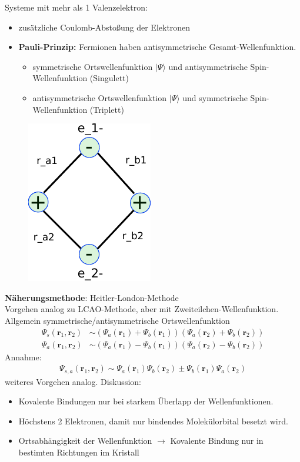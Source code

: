 Systeme mit mehr als 1 Valenzelektron:
\begin{itemize}
	\item zusätzliche Coulomb-Abstoßung der Elektronen
	\item \textbf{Pauli-Prinzip:} Fermionen haben antisymmetrische Gesamt-Wellenfunktion.
	\begin{itemize}
		\item symmetrische Ortswellenfunktion $\vert\Psi\rangle$ und antisymmetrische Spin-Wellenfunktion (Singulett)
		\item antisymmetrische Ortswellenfunktion $\vert\Psi\rangle$ und symmetrische Spin-Wellenfunktion (Triplett)
	\end{itemize}
\end{itemize}
\begin{figure}[]
	\centering
	\includegraphics{figures/1_4H2Moleuel.pdf}
	\caption{}
	\label{}
\end{figure}

\textbf{Näherungsmethode}: Heitler-London-Methode\\
Vorgehen analog zu LCAO-Methode, aber mit Zweiteilchen-Wellenfunktion.\\
Allgemein symmetrische/antisymmetrische Ortswellenfunktion
\begin{align*}
	\Psi_s(\textbf{r}_1,\textbf{r}_2) &\sim (\Psi_a(\textbf{r}_1) + \Psi_b(\textbf{r}_1)) (\Psi_a(\textbf{r}_2) + \Psi_b (\textbf{r}_2))\\
	\Psi_a(\textbf{r}_1,\textbf{r}_2) &\sim (\Psi_a(\textbf{r}_1) - \Psi_b(\textbf{r}_1)) (\Psi_a(\textbf{r}_2) - \Psi_b (\textbf{r}_2))
\end{align*}
Annahme:
\begin{align*}
	\Psi_{s,a}(\textbf{r}_1,\textbf{r}_2) \sim \Psi_a(\textbf{r}_1) \Psi_b (\textbf{r}_2) \pm \Psi_b (\textbf{r}_1) \Psi_a (\textbf{r}_2)
\end{align*}
weiteres Vorgehen analog.
Diskussion:
\begin{itemize}
	\item Kovalente Bindungen nur bei starkem Überlapp der Wellenfunktionen.
	\item Höchstens 2 Elektronen, damit nur bindendes Molekülorbital besetzt wird.
	\item Ortsabhängigkeit der Wellenfunktion $\rightarrow$ Kovalente Bindung nur in bestimten Richtungen im Kristall
\end{itemize}

